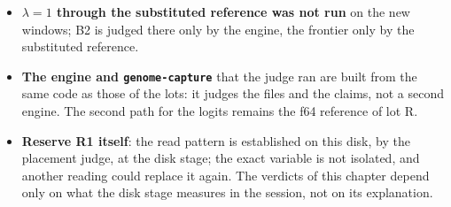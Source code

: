 \begin{faux}
\begin{itemize}
\item \textbf{$\lambda = 1$ through the substituted reference was not run} on the new windows; B2 is judged there only by the engine, the frontier only by the substituted reference.
\item \textbf{The engine and \texttt{genome-capture}} that the judge ran are built from the same code as those of the lots: it judges the files and the claims, not a second engine. The second path for the logits remains the f64 reference of lot R.
\item \textbf{Reserve R1 itself}: the read pattern is established on this disk, by the placement judge, at the disk stage; the exact variable is not isolated, and another reading could replace it again. The verdicts of this chapter depend only on what the disk stage measures in the session, not on its explanation.
\end{itemize}
\end{faux}
